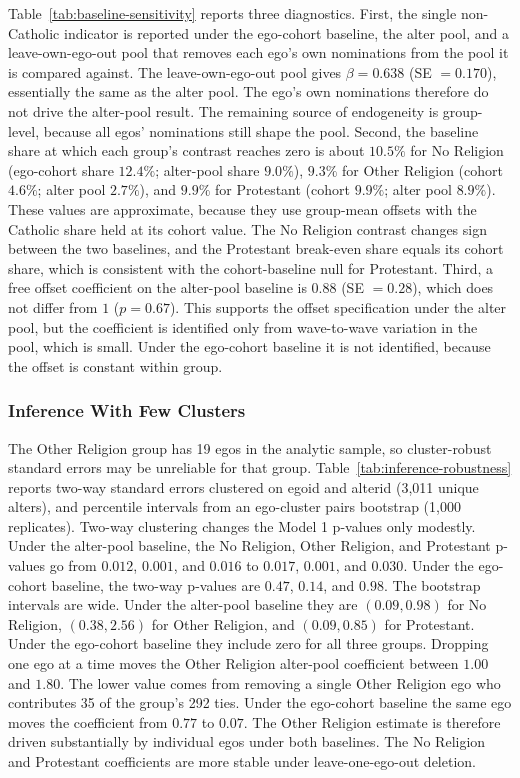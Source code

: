 \documentclass[11pt]{article}
\begin{document}
Table~\ref{tab:baseline-sensitivity} reports three diagnostics. First, the single non-Catholic indicator is reported under the ego-cohort baseline, the alter pool, and a leave-own-ego-out pool that removes each ego's own nominations from the pool it is compared against. The leave-own-ego-out pool gives $\beta = 0.638$ (SE $= 0.170$), essentially the same as the alter pool. The ego's own nominations therefore do not drive the alter-pool result. The remaining source of endogeneity is group-level, because all egos' nominations still shape the pool. Second, the baseline share at which each group's contrast reaches zero is about $10.5\%$ for No Religion (ego-cohort share $12.4\%$; alter-pool share $9.0\%$), $9.3\%$ for Other Religion (cohort $4.6\%$; alter pool $2.7\%$), and $9.9\%$ for Protestant (cohort $9.9\%$; alter pool $8.9\%$). These values are approximate, because they use group-mean offsets with the Catholic share held at its cohort value. The No Religion contrast changes sign between the two baselines, and the Protestant break-even share equals its cohort share, which is consistent with the cohort-baseline null for Protestant. Third, a free offset coefficient on the alter-pool baseline is $0.88$ (SE $= 0.28$), which does not differ from $1$ ($p = 0.67$). This supports the offset specification under the alter pool, but the coefficient is identified only from wave-to-wave variation in the pool, which is small. Under the ego-cohort baseline it is not identified, because the offset is constant within group.

\subsubsection{Inference With Few Clusters}

The Other Religion group has 19 egos in the analytic sample, so cluster-robust standard errors may be unreliable for that group. Table~\ref{tab:inference-robustness} reports two-way standard errors clustered on egoid and alterid (3,011 unique alters), and percentile intervals from an ego-cluster pairs bootstrap (1,000 replicates). Two-way clustering changes the Model 1 p-values only modestly. Under the alter-pool baseline, the No Religion, Other Religion, and Protestant p-values go from $0.012$, $0.001$, and $0.016$ to $0.017$, $0.001$, and $0.030$. Under the ego-cohort baseline, the two-way p-values are $0.47$, $0.14$, and $0.98$. The bootstrap intervals are wide. Under the alter-pool baseline they are $(0.09, 0.98)$ for No Religion, $(0.38, 2.56)$ for Other Religion, and $(0.09, 0.85)$ for Protestant. Under the ego-cohort baseline they include zero for all three groups. Dropping one ego at a time moves the Other Religion alter-pool coefficient between $1.00$ and $1.80$. The lower value comes from removing a single Other Religion ego who contributes 35 of the group's 292 ties. Under the ego-cohort baseline the same ego moves the coefficient from $0.77$ to $0.07$. The Other Religion estimate is therefore driven substantially by individual egos under both baselines. The No Religion and Protestant coefficients are more stable under leave-one-ego-out deletion.
\end{document}
